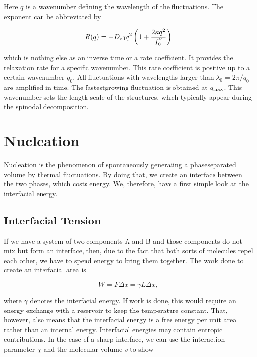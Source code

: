 \documentclass[letterpaper,10pt,english]{sphinxmanual}
\begin{document}
\sphinxAtStartPar
Here \(q\) is a wavenumber defining the wavelength of the fluctuations. The exponent can be abbreviated by

\sphinxAtStartPar
\begin{equation}
R(q)= -D_{\rm eff} q^{2}\left (1+\frac{2\kappa q^{2}}{f_{0}^{''}}\right )
\end{equation}

\sphinxAtStartPar
which is nothing else as an inverse time or a rate coefficient. It provides the relaxation rate for a specific wavenumber. This rate coefficient is positive up to a certain wavenumber \(q_0\). All fluctuations with wavelengths larger than \(λ_0=2π/q_0\) are amplified in time. The fastest\sphinxhyphen{}growing fluctuation is obtained at \(q_{\rm max}\). This wavenumber sets the length scale of the structures, which typically appear during the spinodal decomposition.


\section{Nucleation}
\label{\detokenize{notebooks/L5/2_Kinetics_LL_Unmixing:Nucleation}}
\sphinxAtStartPar
Nucleation is the phenomenon of spontaneously generating a phase\sphinxhyphen{}separated volume by thermal fluctuations. By doing that, we create an interface between the two phases, which costs energy. We, therefore, have a first simple look at the interfacial energy.


\subsection{Interfacial Tension}
\label{\detokenize{notebooks/L5/2_Kinetics_LL_Unmixing:Interfacial-Tension}}
\sphinxAtStartPar
If we have a system of two components A and B and those components do not mix but form an interface, then, due to the fact that both sorts of molecules repel each other, we have to spend energy to bring them together. The work done to create an interfacial area is

\sphinxAtStartPar
\begin{equation}
W=F \Delta x=\gamma L \Delta x,
\end{equation}

\sphinxAtStartPar
where \(γ\) denotes the interfacial energy. If work is done, this would require an energy exchange with a reservoir to keep the temperature constant. That, however, also means that the interfacial energy is a free energy per unit area rather than an internal energy. Interfacial energies may contain entropic contributions. In the case of a sharp interface, we can use the interaction parameter \(χ\) and the molecular volume \(v\) to show
\end{document}
